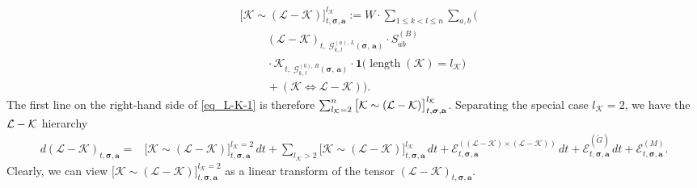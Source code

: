 \documentclass[10pt,reqno]{article}
\theoremstyle{plain} %
\theoremstyle{remark}
\numberwithin{equation}{section}
\begin{document}
\begin{align}\label{DefKsimLK}
&\Big[\mathcal{K} \sim (\mathcal{L} - \mathcal{K})\Big]^{l_\mathcal{K}}_{t, \boldsymbol{\sigma}, \textbf{a}}
 := W\cdot \sum_{1 \leq k < l \leq n} \sum_{a, b}
   \Big( \nonumber \\
&\hspace{1cm}
   (\mathcal{L} - \mathcal{K})_{t,\;  \mathcal{G}^{(a), \,L}_{k, \,l}\left(\boldsymbol{\sigma},\, \textbf{a}\right)}
   \cdot S^{(B)}_{ab} \nonumber \\
&\hspace{1cm}
   \cdot
   \mathcal{K}_{t,\;  \mathcal{G}^{(b), \,R}_{k, \,l}\left(\boldsymbol{\sigma},\, \textbf{a}\right)}
   \cdot \textbf{1}\bigl(\operatorname{length}(\mathcal{K})=l_\mathcal{K}\bigr) \nonumber \\
&\hspace{1cm} + \left(\mathcal{K} \iff \mathcal{L-K} \right) \Big).
\end{align}
The first line on the right-hand side of \eqref{eq_L-K-1} is therefore
\(\sum_{l_{\cal K}=2}^n\big[\mathcal{K}\sim(\mathcal{L}-\mathcal{K})\big]^{l_\mathcal{K}}_{t,\boldsymbol{\sigma},\textbf{a}}\).
Separating the special case $l_\mathcal{K} =2$, we have 
 the  $\cal L-K$ hierarchy 
\begin{align}\label{eq_L-Keee}
    d(\mathcal{L} - \mathcal{K})_{t, \boldsymbol{\sigma}, \textbf{a}} = &
    \Big[\mathcal{K} \sim (\mathcal{L} - \mathcal{K})\Big]^{l_\mathcal{K} = 2}_{t, \boldsymbol{\sigma}, \textbf{a}}\,dt + \sum_{l_\mathcal{K} > 2} \Big[\mathcal{K} \sim (\mathcal{L} - \mathcal{K})\Big]^{l_\mathcal{K}}_{t, \boldsymbol{\sigma}, \textbf{a}}\,dt + \mathcal{E}^{((\mathcal{L} - \mathcal{K}) \times (\mathcal{L} - \mathcal{K}))}_{t, \boldsymbol{\sigma}, \textbf{a}}\,dt +
    \mathcal{E}^{(\widetilde{G})}_{t, \boldsymbol{\sigma}, \textbf{a}}\,dt +
    \mathcal{E}^{(M)}_{t, \boldsymbol{\sigma}, \textbf{a}} .
\end{align} 
Clearly, we can view $\Big[\mathcal{K} \sim (\mathcal{L} - \mathcal{K})\Big]^{l_\mathcal{K} = 2}_{t, \boldsymbol{\sigma}, \textbf{a}}$ as a linear transform of  the  tensor $(\mathcal{L} - \mathcal{K})_{t, \boldsymbol{\sigma}, \textbf{a}}$.
\end{document}
